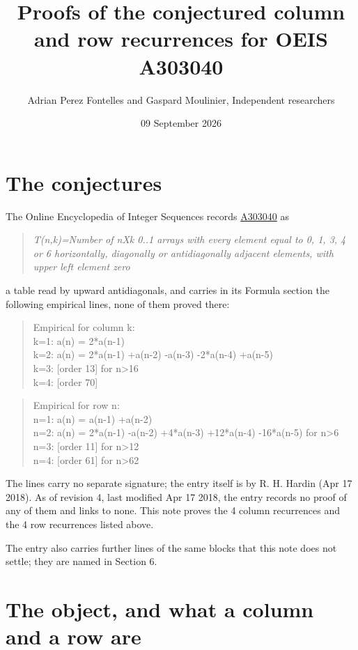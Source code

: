 \documentclass[11pt]{article}
\title{Proofs of the conjectured column and row recurrences for OEIS A303040}
\author{Adrian Perez Fontelles and Gaspard Moulinier, Independent researchers}
\date{09 September 2026}
\theoremstyle{definition}
\begin{document}
\maketitle
\section{The conjectures}

The Online Encyclopedia of Integer Sequences records \href{https://oeis.org/A303040}{A303040} as

\begin{quote}\itshape T(n,k)=Number of nXk 0..1 arrays with every element equal to 0, 1, 3, 4 or 6 horizontally, diagonally or antidiagonally adjacent elements, with upper left element zero\end{quote}

a table read by upward antidiagonals, and carries in its Formula section the following empirical lines, none of them proved there:

\begin{quote}\ttfamily Empirical for column k:\\
k=1: a(n) = 2*a(n-1)\\k=2: a(n) = 2*a(n-1) +a(n-2) -a(n-3) -2*a(n-4) +a(n-5)\\k=3: [order 13] for n>16\\k=4: [order 70]\end{quote}

\begin{quote}\ttfamily Empirical for row n:\\
n=1: a(n) = a(n-1) +a(n-2)\\n=2: a(n) = 2*a(n-1) -a(n-2) +4*a(n-3) +12*a(n-4) -16*a(n-5) for n>6\\n=3: [order 11] for n>12\\n=4: [order 61] for n>62\end{quote}

The lines carry no separate signature; the entry itself is by R. H. Hardin (Apr 17 2018). As of revision 4, last modified Apr 17 2018, the entry records no proof of any of them and links to none. This note proves the 4 column recurrences and the 4 row recurrences listed above.

The entry also carries further lines of the same blocks that this note does not settle; they are named in Section 6.

\section{The object, and what a column and a row are}
\end{document}
